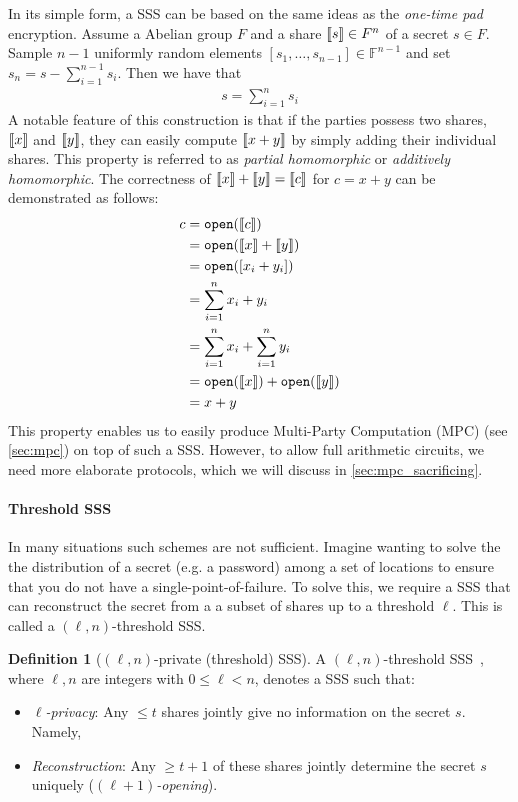 \documentclass[11pt]{report}
\theoremstyle{definition}
\newtheorem{definition}{Definition}[section]
\theoremstyle{plain}
\begin{document}
In its simple form, a SSS can be based on the same ideas as the \textit{one-time pad} encryption. Assume a Abelian group $F$ and a share $\llbracket s \rrbracket \in F^n$ of a secret $s \in F$. Sample $n-1$ uniformly random elements $[s_1, \dots, s_{n-1}] \in \mathbb{F}^{n-1}$ and set $s_n = s - \sum_{i=1}^{n-1} s_i$. Then we have that
\begin{align*}
  s = \sum_{i=1}^{n} s_i
\end{align*}
A notable feature of this construction is that if the parties possess two shares, $\llbracket x \rrbracket$ and $\llbracket y \rrbracket$, they can easily compute $\llbracket x + y \rrbracket$ by simply adding their individual shares. This property is referred to as \textit{partial homomorphic} or \textit{additively homomorphic}. The correctness of $\llbracket x \rrbracket + \llbracket y \rrbracket = \llbracket c \rrbracket$ for $c = x + y$ can be demonstrated as follows:
\begin{align*}
  c & = \texttt{open}(\llbracket c \rrbracket)                         \\
    & = \texttt{open}(\llbracket x \rrbracket + \llbracket y \rrbracket)                \\
    & = \texttt{open}([x_i + y_i])                    \\
    & = \sum_{i=1}^{n} x_i + y_i                      \\
    & = \sum_{i=1}^{n} x_i + \sum_{i=1}^{n} y_i       \\
    & = \texttt{open}(\llbracket x \rrbracket) + \texttt{open}(\llbracket y \rrbracket) \\
    & = x + y
\end{align*}
This property enables us to easily produce Multi-Party Computation (MPC) (see \autoref{sec:mpc}) on top of such a SSS\@. However, to allow full arithmetic circuits, we need more elaborate protocols, which we will discuss in \autoref{sec:mpc_sacrificing}.

\paragraph{Threshold SSS}\label{sec:threshold-sss}

In many situations such schemes are not sufficient. Imagine wanting to solve the the distribution of a secret (e.g. a password) among a set of locations to ensure that you do not have a single-point-of-failure. To solve this, we require a SSS that can reconstruct the secret from a a subset of shares up to a threshold $\ell$. This is called a $(\ell, n)$-threshold SSS\@.

\begin{definition}[$(\ell, n)$-private (threshold) SSS]\label{def:mpc-ss-threshold}
  A $(\ell, n)$-threshold SSS~\cite{cramer2015secure}, where $\ell, n$ are integers with $0 \leq \ell < n$, denotes a SSS such that:
  \begin{itemize}[parsep=0pt, itemsep=0pt]
    \item \textit{$\ell$-privacy}: Any $\leq t$ shares jointly give no information on the secret $s$. Namely,
    \item \textit{Reconstruction}: Any $\geq t + 1$ of these shares jointly determine the secret $s$ uniquely (\textit{$(\ell + 1)$-opening}).
  \end{itemize}
\end{definition}
\end{document}

